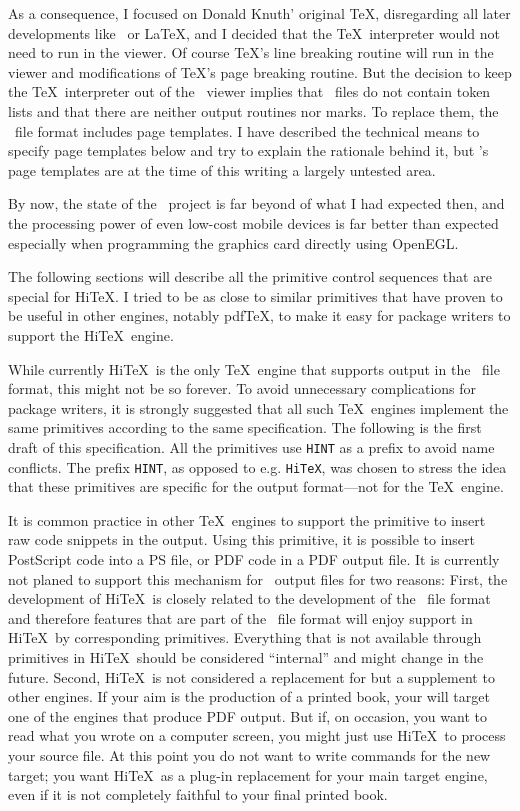 As a consequence, I focused on Donald Knuth' original \TeX,
disregarding all later developments like \eTeX\ or \LaTeX, and I
decided that the \TeX\ interpreter would not need to run in the
viewer.
Of course \TeX's line breaking routine will run in the viewer
and modifications of \TeX's page breaking routine. 
But the decision to keep the \TeX\ interpreter
out of the \HINT\ viewer implies that \HINT\ files do
not contain token lists and that there are
neither output routines nor marks.
To replace them, the \HINT\ file format includes
page templates. I have described the technical
means to specify page templates below and try to explain
the rationale behind it, but \HINT's page templates 
are at the time of this writing a largely untested area.

By now, the state of the \HINT\ project is far beyond of what
I had expected then, and the processing power of even low-cost
mobile devices is far better than expected especially when programming the
graphics card directly using OpenEGL.

The following sections will describe all the primitive control sequences
that are special for Hi\TeX. I tried to be as close to similar primitives
that have proven to be useful in other engines, notably pdf\TeX, to make
it easy for package writers to support the Hi\TeX\ engine.

While currently Hi\TeX\ is the only \TeX\ engine that supports output in the \HINT\ file
format, this might not be so forever. To avoid unnecessary complications for 
package writers, it is strongly suggested that all such \TeX\ engines implement
the same primitives according to the same specification. The following is the first
draft of this specification. All the primitives use {\tt HINT} as a prefix to
avoid name conflicts. The prefix {\tt HINT}, as opposed to e.g. {\tt HiTeX},
was chosen to stress the idea that these primitives are specific for the
output format---not for the \TeX\ engine. 

It is common practice in other \TeX\ engines to support the  
primitive to insert raw code snippets in the output. Using this primitive,
it is possible to insert PostScript code into a PS file, or PDF code in a 
PDF output file. It is currently not planed to support this mechanism for
\HINT\ output files for two reasons: 
First, the development of Hi\TeX\ is closely related to the development of
the \HINT\ file format and therefore features that are part of the \HINT\
file format will enjoy support in Hi\TeX\ by corresponding primitives.
Everything that is not available through primitives in Hi\TeX\ should
be considered ``internal'' and might change in the future.
Second, Hi\TeX\ is not considered a replacement for but 
a supplement to other engines. If your aim is the production of a printed
book, your will target one of the engines that produce PDF output.
But if, on occasion, you want to read what you wrote on a computer screen,
you might just use Hi\TeX\ to process your source file. At this point you
do not want to write \ctl{special} commands for the new target; you want
Hi\TeX\ as a plug-in replacement for your main target engine, even if it
is not completely faithful to your final printed book.  

